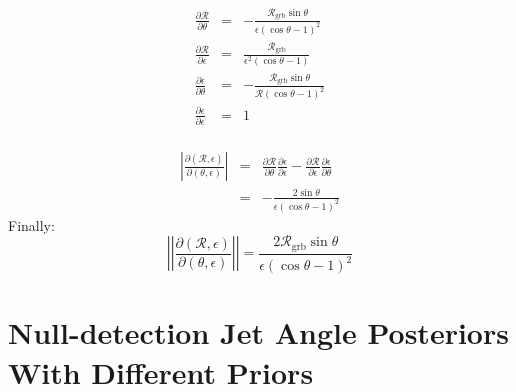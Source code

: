 \documentclass[twocolumn,nofootinbib]{revtex4-1}
\newcommand{\grbrate}{{{\mathcal R}_{\mathrm{grb}}}}
\newcommand{\cbcrate}{{{\mathcal R}}}
\begin{document}
\endgroup

\begin{eqnarray}
\frac{\partial \cbcrate}{\partial \theta} & = &
-\frac{\grbrate\sin\theta}{\epsilon(\cos\theta - 1)^2}\\
\frac{\partial \cbcrate}{\partial \epsilon} & = &
\frac{\grbrate}{\epsilon^2(\cos\theta-1)}\\
\frac{\partial \epsilon}{\partial \theta} & = &
-\frac{\grbrate\sin\theta}{\cbcrate(\cos\theta-1)^2}\\
\frac{\partial \epsilon}{\partial \epsilon} & = & 1\\
\end{eqnarray}

\begin{eqnarray}
\left\lvert
\frac{\partial(\cbcrate,\epsilon)}{\partial(\theta,\epsilon)}
\right\rvert & = & \frac{\partial \cbcrate}{\partial \theta}
\frac{\partial \epsilon}{\partial \epsilon} - \frac{\partial \cbcrate}{\partial
\epsilon}\frac{\partial \epsilon}{\partial \theta} \\
& = & -\frac{2\sin\theta}{\epsilon(\cos\theta-1)^2}
\end{eqnarray}
%
Finally:
\begin{equation}
\left\lvert\left\lvert
\frac{\partial(\cbcrate,\epsilon)}{\partial(\theta,\epsilon)}
\right\rvert\right\rvert = \frac{2\grbrate\sin\theta}{\epsilon(\cos\theta-1)^2} 
\end{equation}

\section{Null-detection Jet Angle Posteriors With Different Priors}


\end{document}
